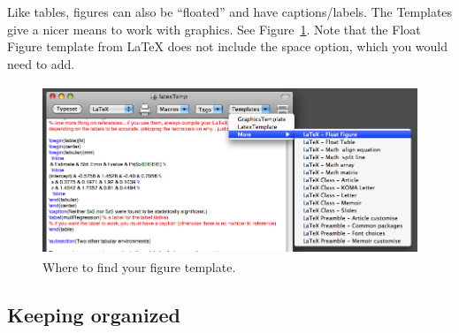 \documentclass[11pt]{article} %
\begin{document}
Like tables, figures can also be ``floated'' and have captions/labels. The Templates give a nicer means to work with graphics. See Figure~\ref{figureTemplate}. Note that the Float Figure template from LaTeX does not include the space option, which you would need to add. \\
\begin{figure}[htbp]
   \centering %
   \includegraphics[height=2.0in]{figures/figureTemplate}
   \caption{Where to find your figure template.}
   \label{figureTemplate}
\end{figure}

\subsection{Keeping organized}
\end{document}
